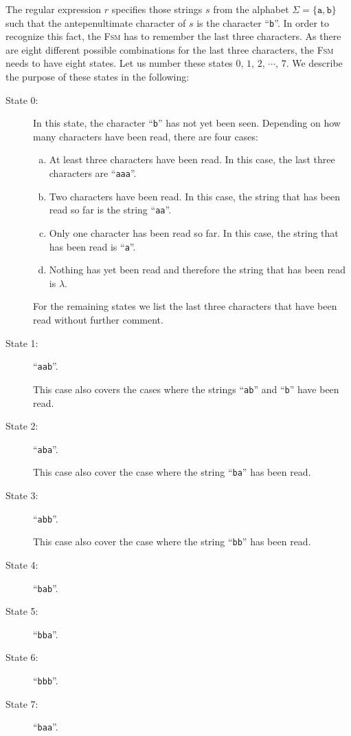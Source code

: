 \solutionEng
The regular expression $r$ specifies those strings $s$ from the alphabet 
$\Sigma = \{ \mathtt{a}, \mathtt{b} \}$ such that the antepenultimate character of $s$ is the
character ``\texttt{b}''.  In order to recognize this fact, the \textsc{Fsm} has to remember the
last three characters.  As there are eight different possible combinations for the last three
characters, the \textsc{Fsm} needs to have eight states.  Let us number these states 
 $0$, $1$, $2$, $\cdots$, $7$.  We describe the purpose of these states in the following:
\begin{description}
\item[State 0:] In this state, the character ``\texttt{b}'' has not yet been seen. 
  Depending on how many characters have been read, there are four cases:
  \begin{enumerate}[(a)]
  \item At least three characters have been read.  In this case, the last three characters are ``\texttt{aaa}''.  
  \item Two characters have been read.  In this case, the string that has been read so far is the string ``\texttt{aa}''.  
  \item Only one character has been read so far. In this case, the string that has been read is ``\texttt{a}''.  
  \item Nothing has yet been read and therefore the string that has been read is $\lambda$.
  \end{enumerate}

                For the remaining states we list the last three characters  that have been read
                without further comment.
\item[State 1:] ``\texttt{aab}''.

                This case also covers the cases where the strings ``\texttt{ab}'' and ``\texttt{b}''
                have been read.
\item[State 2:] ``\texttt{aba}''.

                This case also cover the case where the string ``\texttt{ba}'' 
                has been read.
\item[State 3:] ``\texttt{abb}''.

                This case also cover the case where the string ``\texttt{bb}'' 
                has been read.
\item[State 4:] ``\texttt{bab}''.
\item[State 5:] ``\texttt{bba}''.
\item[State 6:] ``\texttt{bbb}''.
\item[State 7:] ``\texttt{baa}''.
\end{description}
